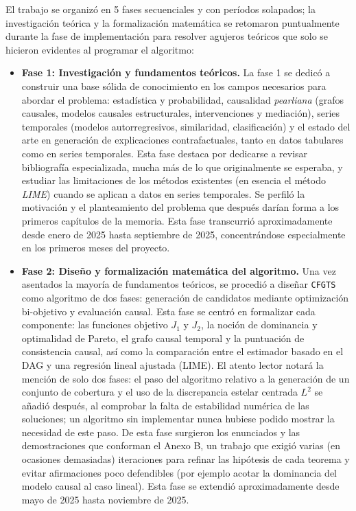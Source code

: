 \documentclass[12pt]{report} %
\begin{document}
El trabajo se organizó en 5 fases secuenciales y con períodos solapados; la investigación teórica y la formalización matemática se retomaron puntualmente durante la fase de implementación para resolver agujeros teóricos que solo se hicieron evidentes al programar el algoritmo:

\begin{itemize}
    \item \textbf{Fase 1: Investigación y fundamentos teóricos.} La fase 1 se dedicó a construir una base sólida de conocimiento en los campos necesarios para abordar el problema: estadística y probabilidad, causalidad \textit{pearliana} (grafos causales, modelos causales estructurales, intervenciones y mediación), series temporales (modelos autorregresivos, similaridad, clasificación) y el estado del arte en generación de explicaciones contrafactuales, tanto en datos tabulares como en series temporales. Esta fase destaca por dedicarse a revisar bibliografía especializada, mucha más de lo que originalmente se esperaba, y estudiar las limitaciones de los métodos existentes (en esencia el método \textit{LIME}) cuando se aplican a datos en series temporales. Se perfiló la motivación y el planteamiento del problema que después darían forma a los primeros capítulos de la memoria. Esta fase transcurrió aproximadamente desde enero de 2025 hasta septiembre de 2025, concentrándose especialmente en los primeros meses del proyecto.

    \item \textbf{Fase 2: Diseño y formalización matemática del algoritmo.} Una vez asentados la mayoría de fundamentos teóricos, se procedió a diseñar \texttt{CFGTS} como algoritmo de dos fases: generación de candidatos mediante optimización bi-objetivo y evaluación causal. Esta fase se centró en formalizar cada componente: las funciones objetivo $J_1$ y $J_2$, la noción de dominancia y optimalidad de Pareto, el grafo causal temporal y la puntuación de consistencia causal, así como la comparación entre el estimador basado en el DAG y una regresión lineal ajustada (LIME). El atento lector notará la mención de solo dos fases: el paso del algoritmo relativo a la generación de un conjunto de cobertura y el uso de la discrepancia estelar centrada $L^2$ se añadió después, al comprobar la falta de estabilidad numérica de las soluciones; un algoritmo sin implementar nunca hubiese podido mostrar la necesidad de este paso. De esta fase surgieron los enunciados y las demostraciones que conforman el Anexo B, un trabajo que exigió varias (en ocasiones demasiadas) iteraciones para refinar las hipótesis de cada teorema y evitar afirmaciones poco defendibles (por ejemplo acotar la dominancia del modelo causal al caso lineal). Esta fase se extendió aproximadamente desde mayo de 2025 hasta noviembre de 2025.


\end{itemize}
\end{document}
